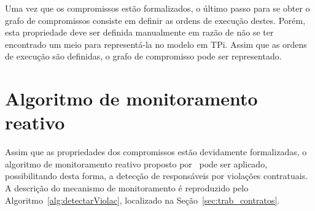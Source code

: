 Uma vez que os compromissos estão formalizados, o último passo para se obter o grafo de compromissos consiste em definir as ordens de execução destes. Porém, esta propriedade deve ser definida manualmente em razão de não se ter encontrado um meio para representá-la no modelo em TPi. Assim que as ordens de execução são definidas, o grafo de compromisso pode ser representado. 

\section{Algoritmo de monitoramento reativo}

Assim que as propriedades dos compromissos estão devidamente formalizadas, o algoritmo de monitoramento reativo proposto por~\citeauthor{xu2004multi} pode ser aplicado, possibilitando desta forma, a detecção de responsáveis por violações contratuais. A descrição do mecanismo de monitoramento é reproduzido pelo Algoritmo~\ref{alg:detectarViolac}, localizado na Seção~\ref{sec:trab_contratos}. 
